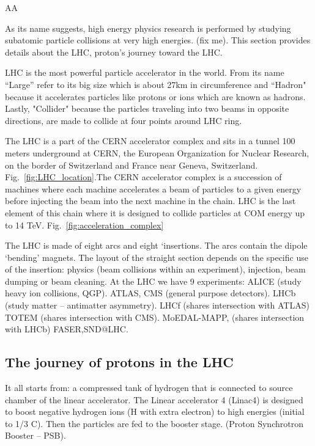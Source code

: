 AA

As its name suggests, high energy physics research is performed by studying subatomic particle collisions at very high energies. (fix me).
This section provides details about the LHC, proton's journey toward the LHC. %

LHC is the most powerful particle accelerator in the world. From its name “Large” refer to its big size which is about 27km in circumference and “Hadron" because it accelerates particles like protons or ions which are known as hadrons. Lastly, "Collider" because the particles traveling into two beams in opposite directions, are made to collide at four points around LHC ring.

The LHC is a part of the CERN accelerator complex and sits in a tunnel 100 meters underground at CERN, the European Organization for Nuclear Research, on the border of Switzerland and France near Geneva, Switzerland. Fig.~\ref{fig:LHC_location}.The CERN accelerator complex is a succession of machines where each machine accelerates a beam of particles to a given energy before injecting the beam into the next machine in the chain. LHC is the last element of this chain where it is designed to collide particles at COM energy up to 14 TeV. Fig.~\ref{fig:acceleration_complex}

The LHC is made of eight arcs and eight ‘insertions. The arcs contain the dipole ‘bending’ magnets. The layout of the straight section depends on the specific use of the insertion: physics (beam collisions within an experiment), injection, beam dumping or beam cleaning. At the LHC we have 9 experiments: ALICE (study heavy ion collisions, QGP). ATLAS, CMS (general purpose detectors). LHCb (study matter – antimatter asymmetry). LHCf (shares intersection with ATLAS) 
TOTEM (shares intersection with CMS). MoEDAL-MAPP, (shares intersection with LHCb) FASER,SND@LHC. 

\subsection{The journey of protons in the LHC}
It all starts from: a compressed tank of hydrogen that is connected to source chamber of the linear accelerator. The Linear accelerator 4 (Linac4) is designed to boost negative hydrogen ions (H with extra electron) to high energies (initial to 1/3 C). Then the particles are fed to the booster stage. (Proton Synchrotron Booster – PSB).

